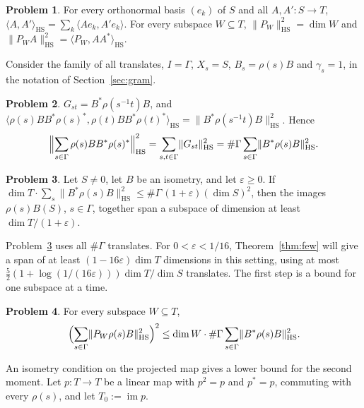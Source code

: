 \documentclass[reqno]{amsart}
\numberwithin{equation}{section}
\theoremstyle{definition}
\newtheorem{problem}{Problem}[section]
\theoremstyle{plain}
\theoremstyle{remark}
\newcommand{\im}{\operatorname{im}}
\newcommand{\HS}{\mathrm{HS}}
\begin{document}
\begin{problem}\label{pr:hs}
For every orthonormal basis \((e_k)\) of \(S\) and all \(A, A' \colon S \to T\), \(\langle A, A' \rangle_\HS = \sum_k \langle Ae_k, A'e_k \rangle\).  For every subspace \(W \subseteq T\), \(\lVert P_W \rVert_\HS^2 = \dim W\) and \(\lVert P_W A \rVert_\HS^2 = \langle P_W, AA^* \rangle_\HS\).
\end{problem}

Consider the family of all translates, \(I = \Gamma\), \(X_s = S\), \(B_s = \rho(s)B\) and \(\gamma_s = 1\), in the notation of Section~\ref{sec:gram}.

\begin{problem}\label{pr:translate-gram}
\(G_{st} = B^*\rho(s^{-1}t)B\), and \(\langle \rho(s)BB^*\rho(s)^*, \rho(t)BB^*\rho(t)^* \rangle_\HS = \lVert B^*\rho(s^{-1}t)B \rVert_\HS^2\).  Hence
\[
  \Bigl\lVert \sum_{s \in \Gamma} \rho(s)BB^*\rho(s)^* \Bigr\rVert_\HS^2 = \sum_{s, t \in \Gamma} \lVert G_{st} \rVert_\HS^2 = \#\Gamma \sum_{s \in \Gamma} \lVert B^*\rho(s)B \rVert_\HS^2 .
\]
\end{problem}

\begin{problem}\label{pr:all-translates}
Let \(S \ne 0\), let \(B\) be an isometry, and let \(\varepsilon \ge 0\).  If \(\dim T \cdot \sum_s \lVert B^*\rho(s)B \rVert_\HS^2 \le \#\Gamma\,(1 + \varepsilon)(\dim S)^2\), then the images \(\rho(s)B(S)\), \(s \in \Gamma\), together span a subspace of dimension at least \(\dim T/(1 + \varepsilon)\).
\end{problem}

Problem~\ref{pr:all-translates} uses all \(\#\Gamma\) translates.  For \(0<\varepsilon<1/16\), Theorem~\ref{thm:few} will give a span of at least \((1-16\varepsilon)\dim T\) dimensions in this setting, using at most \(\frac52(1+\log(1/(16\varepsilon)))\dim T/\dim S\) translates.  The first step is a bound for one subspace at a time.

\begin{problem}\label{pr:cs}
For every subspace \(W \subseteq T\),
\[
  \Bigl( \sum_{s \in \Gamma} \lVert P_W\rho(s)B \rVert_\HS^2 \Bigr)^2 \le \dim W \cdot \#\Gamma \sum_{s \in \Gamma} \lVert B^*\rho(s)B \rVert_\HS^2 .
\]
\end{problem}

An isometry condition on the projected map gives a lower bound for the second moment.  Let \(p \colon T \to T\) be a linear map with \(p^2 = p\) and \(p^* = p\), commuting with every \(\rho(s)\), and let \(T_0 := \im p\).
\end{document}
